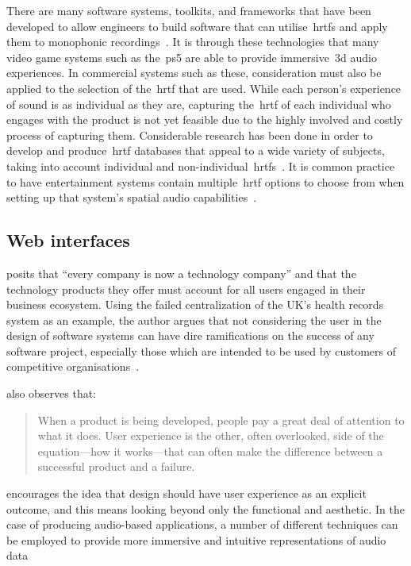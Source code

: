 There are many software systems, toolkits, and frameworks that have been developed to allow engineers to build software that can utilise~\glspl{hrtf} and apply them to monophonic recordings~\citep{3d_tune_in, resonance}.
It is through these technologies that many video game systems such as the~\gls{ps5} are able to provide immersive~\gls{3d} audio experiences.
In commercial systems such as these, consideration must also be applied to the selection of the~\gls{hrtf} that are used.
While each person's experience of sound is as individual as they are, capturing the~\gls{hrtf} of each individual who engages with the product is not yet feasible due to the highly involved and costly process of capturing them.
Considerable research has been done in order to develop and produce~\gls{hrtf} databases that appeal to a wide variety of subjects, taking into account individual and non-individual~\glspl{hrtf}~\citep{armstrong_}.
It is common practice to have entertainment systems contain multiple~\gls{hrtf} options to choose from when setting up that system's spatial audio capabilities~\citep{shukla2018user}.

\subsection{Web interfaces}\label{subsec:web-interfaces}
\citet{kantamneni2022user} posits
that ``every company is now a technology company''
and that the technology products they offer must account for all users engaged in their business ecosystem.
Using the failed centralization of the UK's health records system as an example, the author argues
that not considering the user in the design of software systems can have dire ramifications on the success of any software project,
especially those which are intended to be used by customers of competitive organisations~\citet{kantamneni2022user}.

\citet{garrett2010elements} also observes that:

\begin{quotation}
    When a product is being developed, people pay a great deal of attention to what it does.
    User experience is the other, often overlooked, side of the equation—how it works—that can often make the difference between a successful product and a failure.
\end{quotation}

\citet{garrett2010elements} encourages the idea that design should have user experience as an explicit outcome,
and this means looking beyond only the functional and aesthetic.
In the case of producing audio-based applications,
a number of different techniques can be employed
to provide more immersive and intuitive representations of audio data~\citep{geolocation-player, discovery-collections}


